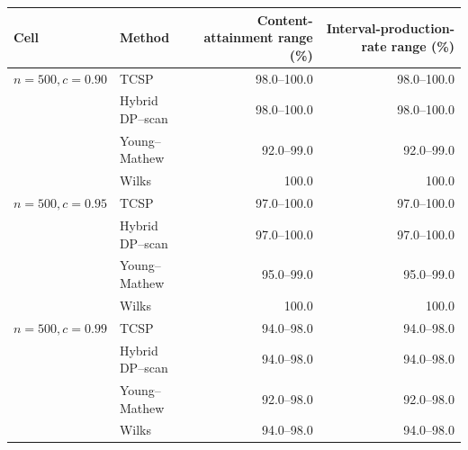 \begin{tabularx}{\textwidth}{@{}l>{\raggedright\arraybackslash}Xrr@{}}
\toprule
Cell & Method & Content-attainment range (\%) & Interval-production-rate range (\%)\\
\midrule
\(n=500,c=0.90\) & TCSP & 98.0--100.0 & 98.0--100.0 \\
 & Hybrid DP--scan & 98.0--100.0 & 98.0--100.0 \\
 & Young--Mathew & 92.0--99.0 & 92.0--99.0 \\
 & Wilks & 100.0 & 100.0 \\
\addlinespace[0.25em]
\(n=500,c=0.95\) & TCSP & 97.0--100.0 & 97.0--100.0 \\
 & Hybrid DP--scan & 97.0--100.0 & 97.0--100.0 \\
 & Young--Mathew & 95.0--99.0 & 95.0--99.0 \\
 & Wilks & 100.0 & 100.0 \\
\addlinespace[0.25em]
\(n=500,c=0.99\) & TCSP & 94.0--98.0 & 94.0--98.0 \\
 & Hybrid DP--scan & 94.0--98.0 & 94.0--98.0 \\
 & Young--Mathew & 92.0--98.0 & 92.0--98.0 \\
 & Wilks & 94.0--98.0 & 94.0--98.0 \\
\bottomrule
\end{tabularx}
